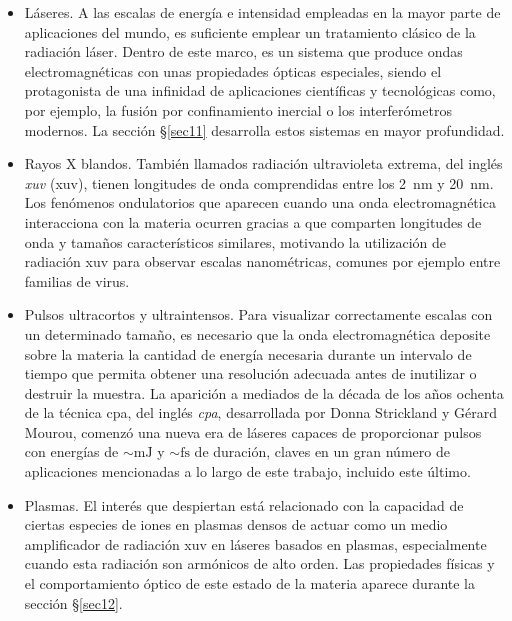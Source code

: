 \begin{itemize}
    \item Láseres. A las escalas de energía e intensidad empleadas en la mayor parte de aplicaciones del mundo, es suficiente emplear un tratamiento clásico de la radiación láser. Dentro de este marco, es un sistema que produce ondas electromagnéticas con unas propiedades ópticas especiales, siendo el protagonista de una infinidad de aplicaciones científicas y tecnológicas como, por ejemplo, la fusión por confinamiento inercial o los interferómetros modernos. La sección \S\ref{sec11} desarrolla estos sistemas en mayor profundidad.
    \item Rayos X blandos. También llamados radiación ultravioleta extrema, del inglés \emph{\acrlong{xuv}} (\acrshort{xuv}), tienen longitudes de onda comprendidas entre los \qty{2}{\nm} y \qty{20}{\nm}. Los fenómenos ondulatorios que aparecen cuando una onda electromagnética interacciona con la materia ocurren gracias a que comparten longitudes de onda y tamaños característicos similares, motivando la utilización de radiación \acrshort{xuv} para observar escalas nanométricas, comunes por ejemplo entre familias de virus.
    \item Pulsos ultracortos y ultraintensos. Para visualizar correctamente escalas con un determinado tamaño, es necesario que la onda electromagnética deposite sobre la materia la cantidad de energía necesaria durante un intervalo de tiempo que permita obtener una resolución adecuada antes de inutilizar o destruir la muestra. La aparición a mediados de la década de los años ochenta de la técnica \acrshort{cpa}, del inglés \emph{\acrlong{cpa}}, desarrollada por Donna Strickland y Gérard Mourou\autocite{Strickland1985CompressionPulses}, comenzó una nueva era de láseres capaces de proporcionar pulsos con energías de $\sim\unit{\mJ}$ y $\sim\unit{\fs}$ de duración, claves en un gran número de aplicaciones mencionadas a lo largo de este trabajo, incluido este último.
    \item Plasmas. El interés que despiertan está relacionado con la capacidad de ciertas especies de iones en plasmas densos de actuar como un medio amplificador de radiación \acrshort{xuv} en láseres basados en plasmas, especialmente cuando esta radiación son armónicos de alto orden. Las propiedades físicas y el comportamiento óptico de este estado de la materia aparece durante la sección \S\ref{sec12}. 

\end{itemize}
